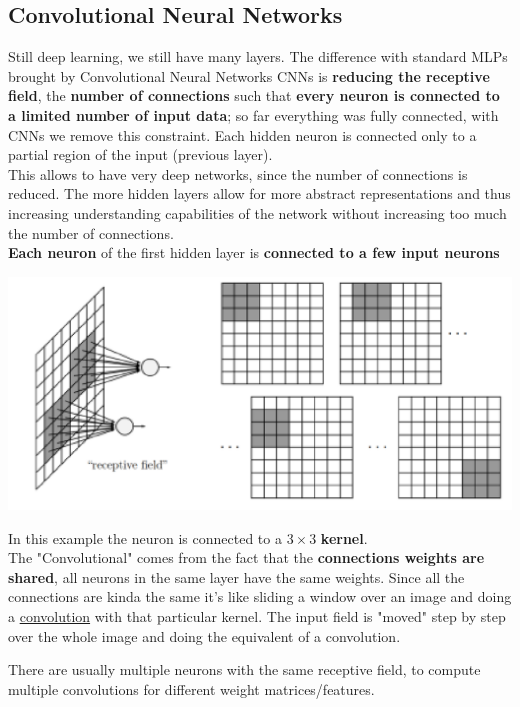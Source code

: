 \newpage

\subsection{Convolutional Neural Networks}
Still deep learning, we still have many layers. The difference with standard MLPs brought by Convolutional Neural Networks CNNs is \textbf{reducing the receptive field}, the \textbf{number of connections} such that \textbf{every neuron is connected to a limited number of input data}; so far everything was fully connected, with CNNs we remove this constraint. Each hidden neuron is connected only to a partial region of the input (previous layer).\\

This allows to have very deep networks, since the number of connections is reduced. The more hidden layers allow for more abstract representations and thus increasing understanding capabilities of the network without increasing too much the number of connections.\\

\textbf{Each neuron} of the first hidden layer is \textbf{connected to a few input neurons}
\begin{center}
	\includegraphics[width=0.7\columnwidth]{img/NN/CNN1}
\end{center}
In this example the neuron is connected to a $3 \times 3$ \textbf{kernel}.\\

The "Convolutional" comes from the fact that the \textbf{connections weights are shared}, all neurons in the same layer have the same weights. Since all the connections are kinda the same it's like sliding a window over an image and doing a \href{https://en.wikipedia.org/wiki/Convolution}{convolution} with that particular kernel. The input field is "moved" step by step over the whole image and doing the equivalent of a convolution.\\

\newpage

There are usually multiple neurons with the same receptive field, to compute multiple convolutions for different weight matrices/features.\\

